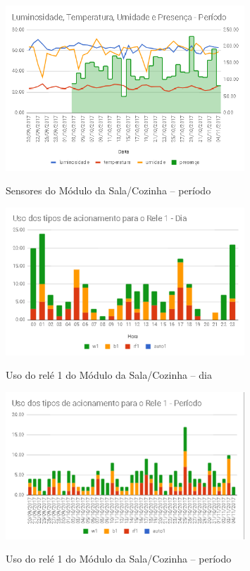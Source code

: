 \begin{figure}[H]
	\centering
	\caption{Sensores do Módulo da Sala/Cozinha -- período}
	\includegraphics[width=0.8\textwidth]{sensoresperiodoSalaCozinha}
	\label{fig:sensoresperiodoSalaCozinha}
\end{figure}

\begin{figure}[H]
	\centering
	\caption{Uso do relé 1 do Módulo da Sala/Cozinha -- dia}
	\includegraphics[width=0.8\textwidth]{usorele1salacozinhadia}
	\label{fig:usorele1salacozinhadia}
\end{figure}

\begin{figure}[H]
	\centering
	\caption{Uso do relé 1 do Módulo da Sala/Cozinha -- período}
	\includegraphics[width=0.8\textwidth]{usorele1salacozinhaperiodo}
	\label{fig:usorele1salacozinhaperiodo}
\end{figure}

